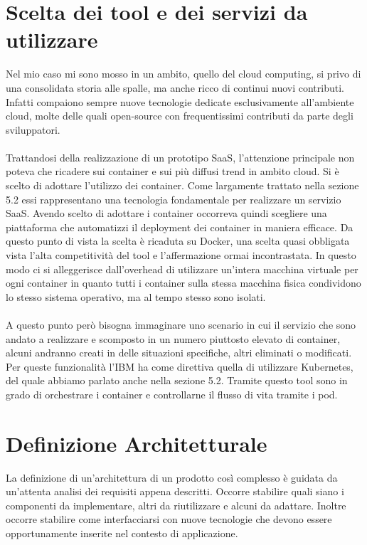 \section{Scelta dei tool e dei servizi da utilizzare}
Nel mio caso mi sono mosso in un ambito, quello del cloud computing, si privo di una consolidata storia alle spalle, ma anche ricco di continui nuovi contributi. Infatti compaiono sempre nuove tecnologie dedicate esclusivamente all'ambiente cloud, molte delle quali open-source con frequentissimi contributi da parte degli sviluppatori.

\paragraph{}
Trattandosi della realizzazione di un prototipo SaaS, l'attenzione principale non poteva che ricadere sui container e sui più diffusi trend in ambito cloud. Si è scelto di adottare l'utilizzo dei container. Come largamente trattato nella sezione 5.2 essi rappresentano una tecnologia fondamentale per realizzare un servizio SaaS. Avendo scelto di adottare i container occorreva quindi scegliere una piattaforma che automatizzi il deployment dei container in maniera efficace. Da questo punto di vista la scelta è ricaduta su Docker, una scelta quasi obbligata vista l'alta competitività del tool e l'affermazione ormai incontrastata. In questo modo ci si alleggerisce dall'overhead di utilizzare un'intera macchina virtuale per ogni container in quanto tutti i container sulla stessa macchina fisica condividono lo stesso sistema operativo, ma al tempo stesso sono isolati. 

\paragraph{}
A questo punto però bisogna immaginare uno scenario in cui il servizio che sono andato a realizzare e scomposto in un numero piuttosto elevato di container, alcuni andranno creati in delle situazioni specifiche, altri eliminati o modificati. Per queste funzionalità l'IBM ha come direttiva quella di utilizzare Kubernetes, del quale abbiamo parlato anche nella sezione 5.2. Tramite questo tool sono in grado di orchestrare i container e controllarne il flusso di vita tramite i pod.

\section{Definizione Architetturale}
La definizione di un'architettura di un prodotto così complesso è guidata da un'attenta analisi dei requisiti appena descritti. Occorre stabilire quali siano i componenti da implementare, altri da riutilizzare e alcuni da adattare. Inoltre occorre stabilire come interfacciarsi con nuove tecnologie che devono essere opportunamente inserite nel contesto di applicazione.

